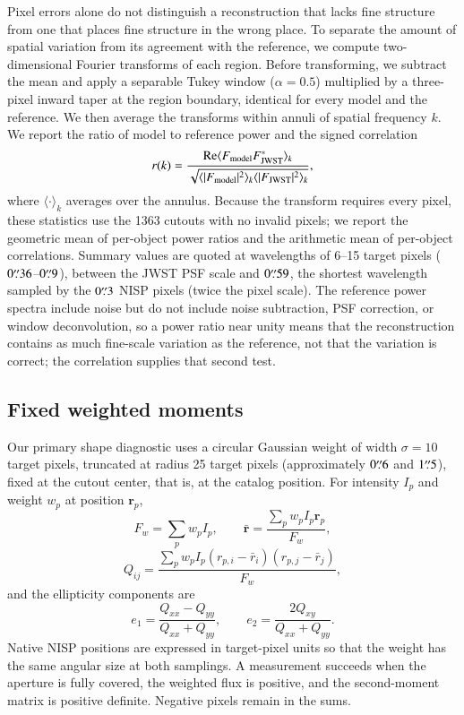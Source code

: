 \documentclass[longauth]{aa}
\begin{document}
Pixel errors alone do not distinguish a reconstruction that lacks fine structure from one that places fine structure in the wrong place.
To separate the amount of spatial variation from its agreement with the reference, we compute two-dimensional Fourier transforms of each region.
Before transforming, we subtract the mean and apply a separable Tukey window ($\alpha=0.5$) multiplied by a three-pixel inward taper at the region boundary, identical for every model and the reference.
We then average the transforms within annuli of spatial frequency $k$.
We report the ratio of model to reference power and the signed correlation
\begin{equation}
 r(k)=\frac{\mathrm{Re}\langle F_{\rm model} F_{\rm JWST}^{*}\rangle_k}
 {\sqrt{\langle |F_{\rm model}|^2\rangle_k\langle |F_{\rm JWST}|^2\rangle_k}},
\end{equation}
where $\langle\cdot\rangle_k$ averages over the annulus.
Because the transform requires every pixel, these statistics use the 1363 cutouts with no invalid pixels; we report the geometric mean of per-object power ratios and the arithmetic mean of per-object correlations.
Summary values are quoted at wavelengths of 6--15 target pixels ($0\overset{\prime\prime}{.}36$--$0\overset{\prime\prime}{.}9$), between the JWST PSF scale and $0\overset{\prime\prime}{.}59$, the shortest wavelength sampled by the $0\overset{\prime\prime}{.}3$ NISP pixels (twice the pixel scale).
The reference power spectra include noise but do not include noise subtraction, PSF correction, or window deconvolution, so a power ratio near unity means that the reconstruction contains as much fine-scale variation as the reference, not that the variation is correct; the correlation supplies that second test.

\subsection{Fixed weighted moments}
\label{sc:fixed_moments}

Our primary shape diagnostic uses a circular Gaussian weight of width $\sigma=10$ target pixels, truncated at radius 25 target pixels (approximately $0\overset{\prime\prime}{.}6$ and $1\overset{\prime\prime}{.}5$), fixed at the cutout center, that is, at the catalog position.
For intensity $I_p$ and weight $w_p$ at position $\boldsymbol{r}_p$,
\begin{equation}
    F_w=\sum_p w_p I_p, \qquad
    \bar{\boldsymbol{r}}=\frac{\sum_p w_p I_p\boldsymbol{r}_p}{F_w},
\end{equation}
\begin{equation}
    Q_{ij}=\frac{\sum_p w_p I_p(r_{p,i}-\bar r_i)(r_{p,j}-\bar r_j)}{F_w},
\end{equation}
and the ellipticity components are
\begin{equation}
    e_1=\frac{Q_{xx}-Q_{yy}}{Q_{xx}+Q_{yy}}, \qquad
    e_2=\frac{2Q_{xy}}{Q_{xx}+Q_{yy}}.
    \label{eq:ellipticity}
\end{equation}
Native NISP positions are expressed in target-pixel units so that the weight has the same angular size at both samplings.
A measurement succeeds when the aperture is fully covered, the weighted flux is positive, and the second-moment matrix is positive definite.
Negative pixels remain in the sums.
\end{document}
